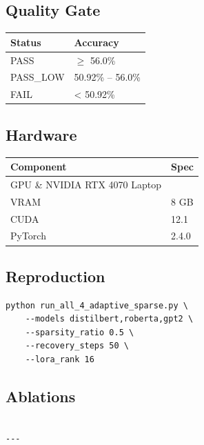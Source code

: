 \subsection{Quality Gate}

\begin{table}[H]
\centering
\small
\begin{tabular}{ll}
\toprule
\textbf{Status} & \textbf{Accuracy} \\
\midrule
PASS & $\ge$ 56.0\% \\
PASS\_LOW & 50.92\% -- 56.0\% \\
FAIL & < 50.92\% \\
\bottomrule
\end{tabular}
\end{table}

\subsection{Hardware}

\begin{table}[H]
\centering
\small
\begin{tabular}{ll}
\toprule
\textbf{Component} & \textbf{Spec} \\
\midrule
GPU \& NVIDIA RTX 4070 Laptop \\
VRAM & 8 GB \\
CUDA & 12.1 \\
PyTorch & 2.4.0 \\
\bottomrule
\end{tabular}
\end{table}

\subsection{Reproduction}

\begin{lstlisting}
python run_all_4_adaptive_sparse.py \
    --models distilbert,roberta,gpt2 \
    --sparsity_ratio 0.5 \
    --recovery_steps 50 \
    --lora_rank 16
\end{lstlisting}

\subsection{Ablations}

\begin{lstlisting}

---
\end{lstlisting}